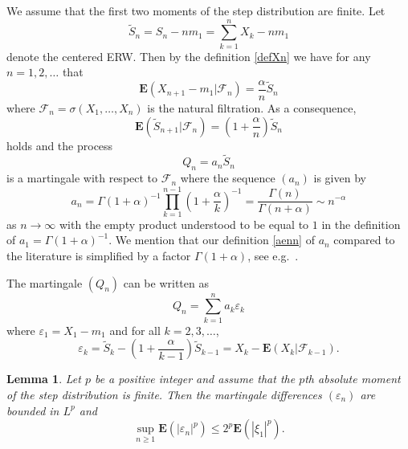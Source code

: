 \documentclass[12pt,a4paper]{article}
\newtheorem{lemma}[thm]{Lemma}
\newcommand{\E}{\mathbf E}
\newcommand{\wt}{\widetilde}
\newcommand{\F}{\mathcal F}
\numberwithin{equation}{section}
\begin{document}
We assume that the first two moments of the step distribution are finite.
Let
\begin{equation}\label{tS_n}
\wt S_n=S_n-nm_1=\sum_{k=1}^n X_k-nm_1
\end{equation}
denote the centered ERW.
Then by the definition \eqref{defXn} we have for any $n=1,2,\dots$ that
\begin{equation}\label{Xcondexp}
\E(X_{n+1}-m_1|\mathcal{F}_n)=\frac{\alpha}{n}\wt S_n
\end{equation}
where $\F_n=\sigma(X_1,\dots,X_n)$ is the natural filtration.
As a consequence,
\begin{equation}
\E(\wt S_{n+1}|\mathcal{F}_n)=\left(1+\frac\alpha n\right)\wt S_n
\end{equation}
holds and the process
\begin{equation}
Q_n=a_n\wt S_n
\end{equation}
is a martingale with respect to $\F_n$ where the sequence $(a_n)$ is given by
\begin{equation} \label{aenn}
a_n=\Gamma(1+\alpha)^{-1}\prod_{k=1}^{n-1}\left(1+\frac\alpha k\right)^{-1}=\frac{\Gamma(n)}{\Gamma(n+\alpha)}\sim n^{-\alpha}
\end{equation}
as $n\to\infty$ with the empty product understood to be equal to $1$ in the definition of $a_1=\Gamma(1+\alpha)^{-1}$.
We mention that our definition \eqref{aenn} of $a_n$ compared to the literature is simplified by a factor $\Gamma(1+\alpha)$, see e.g.~\cite{Bercu17}.

The martingale $(Q_n)$ can be written as
\begin{equation}\label{Qnsumrepr}
Q_n=\sum_{k=1}^na_k\varepsilon_k
\end{equation}
where $\varepsilon_1=X_1-m_1$ and for all $k=2,3,\dots$,
\begin{equation}\label{defeps}
\varepsilon_k=\wt S_k-\left(1+\frac\alpha{k-1}\right)\wt S_{k-1}=X_k-\E(X_k|\mathcal F_{k-1}).
\end{equation}

\begin{lemma}\label{lemma:Lpbound}
Let $p$ be a positive integer and assume that the $p$th absolute moment of the step distribution is finite.
Then the martingale differences $(\varepsilon_n)$ are bounded in $L^p$ and
\begin{equation}\label{Lpbound}
\sup_{n\ge1}\E(|\varepsilon_n|^p)\le2^p\E(|\xi_1|^p).
\end{equation}
\end{lemma}
\end{document}
